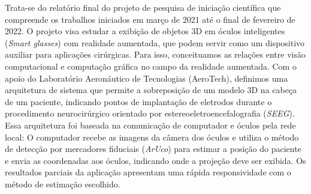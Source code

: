 \documentclass[Portugues]{projetoFAPESP}
\begin{document}

\geraTitulo

\folhaDeRosto

\begin{resumo}

Trata-se do relatório final do projeto de pesquisa de iniciação científica que compreende os trabalhos iniciados em março de 2021 até o final de fevereiro de 2022. O projeto visa estudar a exibição de objetos 3D em óculos inteligentes (\textit{Smart glasses}) com realidade aumentada, que podem servir como um dispositivo auxiliar para aplicações cirúrgicas. Para isso, conceituamos as relações entre visão computacional e computação gráfica no campo da realidade aumentada. Com o apoio do Laboratório Aeronáutico de Tecnologias (AeroTech), definimos uma arquitetura de sistema que permite a sobreposição de um modelo 3D na cabeça de um paciente, indicando pontos de implantação de eletrodos durante o procedimento neurocirúrgico orientado por estereoeletroencefalografia (\textit{SEEG}). Essa arquitetura foi baseada na comunicação de computador e óculos pela rede local: O computador recebe as imagens da câmera dos óculos e utiliza o método de detecção por mercadores fiduciais (\textit{ArUco}) para estimar a posição do paciente e envia as coordenadas aos óculos, indicando onde a projeção deve ser exibida. Os resultados parciais da aplicação apresentam uma rápida responsividade com o método de estimação escolhido.

  
\end{resumo}

\clearpage
\tableofcontents
\thispagestyle{empty}
\clearpage










\printbibliography[heading=bibintoc, title={Referências bibliográficas} ]
\end{document}

